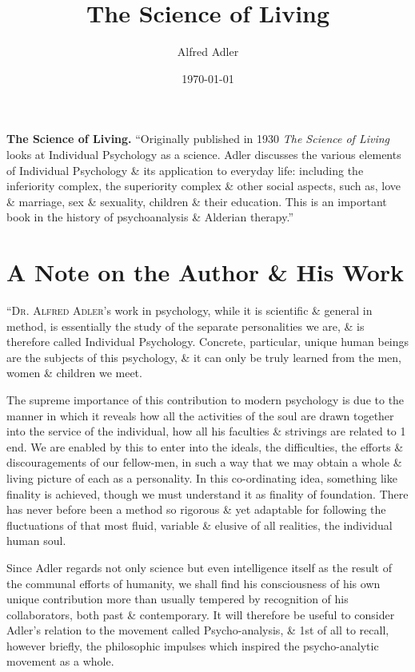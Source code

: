 \documentclass{article}
\title{The Science of Living}
\author{Alfred Adler}
\date{\today}
\numberwithin{equation}{section}
\begin{document}
\maketitle
\tableofcontents
\vspace{5mm}
\textbf{The Science of Living.} ``Originally published in 1930 \textit{The Science of Living} looks at Individual Psychology as a science. Adler discusses the various elements of Individual Psychology \& its application to everyday life: including the inferiority complex, the superiority complex \& other social aspects, such as, love \& marriage, sex \& sexuality, children \& their education. This is an important book in the history of psychoanalysis \& Alderian therapy.''

\section*{A Note on the Author \& His Work}
``\textsc{Dr. Alfred Adler}'s work in psychology, while it is scientific \& general in method, is essentially the study of the separate personalities we are, \& is therefore called Individual Psychology. Concrete, particular, unique human beings are the subjects of this psychology, \& it can only be truly learned from the men, women \& children we meet.

The supreme importance of this contribution to modern psychology is due to the manner in which it reveals how all the activities of the soul are drawn together into the service of the individual, how all his faculties \& strivings are related to 1 end. We are enabled by this to enter into the ideals, the difficulties, the efforts \& discouragements of our fellow-men, in such a way that we may obtain a whole \& living picture of each as a personality. In this co-ordinating idea, something like finality is achieved, though we must understand it as finality of foundation. There has never before been a method so rigorous \& yet adaptable for following the fluctuations of that most fluid, variable \& elusive of all realities, the individual human soul.

Since Adler regards not only science but even intelligence itself as the result of the communal efforts of humanity, we shall find his consciousness of his own unique contribution more than usually tempered by recognition of his collaborators, both past \& contemporary. It will therefore be useful to consider Adler's relation to the movement called Psycho-analysis, \& 1st of all to recall, however briefly, the philosophic impulses which inspired the psycho-analytic movement as a whole.
\end{document}

